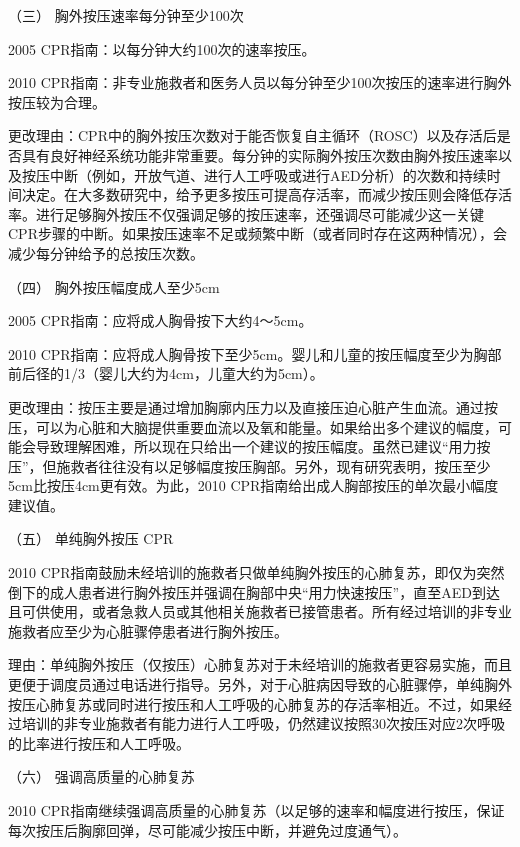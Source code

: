 \hypertarget{text00282.htmlux5cux23CHP10-1-3-2-3}{}
（三） 胸外按压速率每分钟至少100次

2005 CPR指南：以每分钟大约100次的速率按压。

2010
CPR指南：非专业施救者和医务人员以每分钟至少100次按压的速率进行胸外按压较为合理。

更改理由：CPR中的胸外按压次数对于能否恢复自主循环（ROSC）以及存活后是否具有良好神经系统功能非常重要。每分钟的实际胸外按压次数由胸外按压速率以及按压中断（例如，开放气道、进行人工呼吸或进行AED分析）的次数和持续时间决定。在大多数研究中，给予更多按压可提高存活率，而减少按压则会降低存活率。进行足够胸外按压不仅强调足够的按压速率，还强调尽可能减少这一关键CPR步骤的中断。如果按压速率不足或频繁中断（或者同时存在这两种情况），会减少每分钟给予的总按压次数。

\hypertarget{text00282.htmlux5cux23CHP10-1-3-2-4}{}
（四） 胸外按压幅度成人至少5cm

2005 CPR指南：应将成人胸骨按下大约4～5cm。

2010
CPR指南：应将成人胸骨按下至少5cm。婴儿和儿童的按压幅度至少为胸部前后径的1/3（婴儿大约为4cm，儿童大约为5cm）。

更改理由：按压主要是通过增加胸廓内压力以及直接压迫心脏产生血流。通过按压，可以为心脏和大脑提供重要血流以及氧和能量。如果给出多个建议的幅度，可能会导致理解困难，所以现在只给出一个建议的按压幅度。虽然已建议“用力按压”，但施救者往往没有以足够幅度按压胸部。另外，现有研究表明，按压至少5cm比按压4cm更有效。为此，2010
CPR指南给出成人胸部按压的单次最小幅度建议值。

\hypertarget{text00282.htmlux5cux23CHP10-1-3-2-5}{}
（五） 单纯胸外按压 CPR

2010
CPR指南鼓励未经培训的施救者只做单纯胸外按压的心肺复苏，即仅为突然倒下的成人患者进行胸外按压并强调在胸部中央“用力快速按压”，直至AED到达且可供使用，或者急救人员或其他相关施救者已接管患者。所有经过培训的非专业施救者应至少为心脏骤停患者进行胸外按压。

理由：单纯胸外按压（仅按压）心肺复苏对于未经培训的施救者更容易实施，而且更便于调度员通过电话进行指导。另外，对于心脏病因导致的心脏骤停，单纯胸外按压心肺复苏或同时进行按压和人工呼吸的心肺复苏的存活率相近。不过，如果经过培训的非专业施救者有能力进行人工呼吸，仍然建议按照30次按压对应2次呼吸的比率进行按压和人工呼吸。

\hypertarget{text00282.htmlux5cux23CHP10-1-3-2-6}{}
（六） 强调高质量的心肺复苏

2010
CPR指南继续强调高质量的心肺复苏（以足够的速率和幅度进行按压，保证每次按压后胸廓回弹，尽可能减少按压中断，并避免过度通气）。

